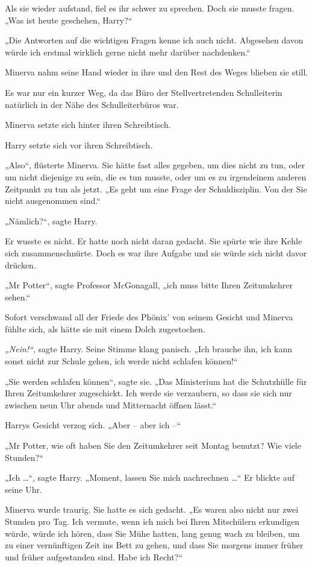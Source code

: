 {Als sie wieder aufstand, fiel es ihr schwer zu sprechen. Doch sie musste fragen. „Was ist heute geschehen, Harry?“

„Die Antworten auf die wichtigen Fragen kenne ich auch nicht. Abgesehen davon würde ich erstmal wirklich gerne nicht mehr darüber nachdenken.“

Minerva nahm seine Hand wieder in ihre und den Rest des Weges blieben sie still.

Es war nur ein kurzer Weg, da das Büro der Stellvertretenden Schulleiterin natürlich in der Nähe des Schulleiterbüros war.

Minerva setzte sich hinter ihren Schreibtisch.

Harry setzte sich vor ihren Schreibtisch.

„Also“, flüsterte Minerva. Sie hätte fast alles gegeben, um dies nicht zu tun, oder um nicht diejenige zu sein, die es tun musste, oder um es zu irgendeinem anderen Zeitpunkt zu tun als jetzt. „Es geht um eine Frage der Schuldisziplin. Von der Sie nicht ausgenommen sind.“

„Nämlich?“, sagte Harry.

Er wusste es nicht. Er hatte noch nicht daran gedacht. Sie spürte wie ihre Kehle sich zusammenschnürte. Doch es war ihre Aufgabe und sie würde sich nicht davor drücken.

„Mr Potter“, sagte Professor McGonagall, „ich muss bitte Ihren Zeitumkehrer sehen.“

Sofort verschwand all der Friede des Phönix' von seinem Gesicht und Minerva fühlte sich, als hätte sie mit einem Dolch zugestochen.

\emph{„Nein!“}, sagte Harry. Seine Stimme klang panisch. „Ich brauche ihn, ich kann sonst nicht zur Schule gehen, ich werde nicht schlafen können!“

„Sie werden schlafen können“, sagte sie. „Das Ministerium hat die Schutzhülle für Ihren Zeitumkehrer zugeschickt. Ich werde sie verzaubern, so dass sie sich nur zwischen neun Uhr abends und Mitternacht öffnen lässt.“

Harrys Gesicht verzog sich. „Aber -- aber ich --“

„Mr Potter, wie oft haben Sie den Zeitumkehrer seit Montag benutzt? Wie viele Stunden?“

„Ich …“, sagte Harry. „Moment, lassen Sie mich nachrechnen …“ Er blickte auf seine Uhr.

Minerva wurde traurig. Sie hatte es sich gedacht. „Es waren also nicht nur zwei Stunden pro Tag. Ich vermute, wenn ich mich bei Ihren Mitschülern erkundigen würde, würde ich hören, dass Sie Mühe hatten, lang genug wach zu bleiben, um zu einer vernünftigen Zeit ins Bett zu gehen, und dass Sie morgens immer früher und früher aufgestanden sind. Habe ich Recht?“

}
